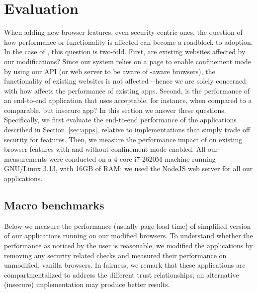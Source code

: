 \section{Evaluation}
\label{sec:eval}

When adding new browser features, even security-centric ones, the
question of how performance or functionality is affected can become a
roadblock to adoption.
%
In the case of \sys{}, this question is two-fold.
%
First, are existing websites affected by our modifications?
%
Since our system relies on a page to enable confinement mode by using
our API (or web server to be aware of \sys{}-aware browsers), the
functionality of existing websites is not affected---hence we are
solely concerned with how \sys{} affects the performance of existing
apps.
%
Second, is the performance of an end-to-end application that uses
\sys{} acceptable, for instance, when compared to a comparable, but
insecure app?
%
In this section we answer these questions.
%
Specifically, we first evaluate the end-to-end performance of the
applications described in Section~\ref{sec:apps}, relative to
implementations that simply trade off security for features.
%
Then, we measure the performance impact of \sys{} on existing browser
features with and without confinement-mode enabled.
%
All our measurements were conducted on a 4-core i7-2620M machine
running GNU/Linux 3.13, with 16GB of RAM; we used the NodeJS web
server for all our applications.
%


\subsection{Macro benchmarks}
\label{sec:eval:macro}

Below we measure the performance (usually page load time) of
simplified version of our applications running on our modified
browsers.
%
To understand whether the performance as noticed by the user is
reasonable, we modified the applications by removing any security
related checks and measured their performance on unmodified, vanilla
browsers.
%
In fairness, we remark that these applications are compartmentalized
to address the different trust relationships; an alternative
(insecure) implementation may produce better results.

